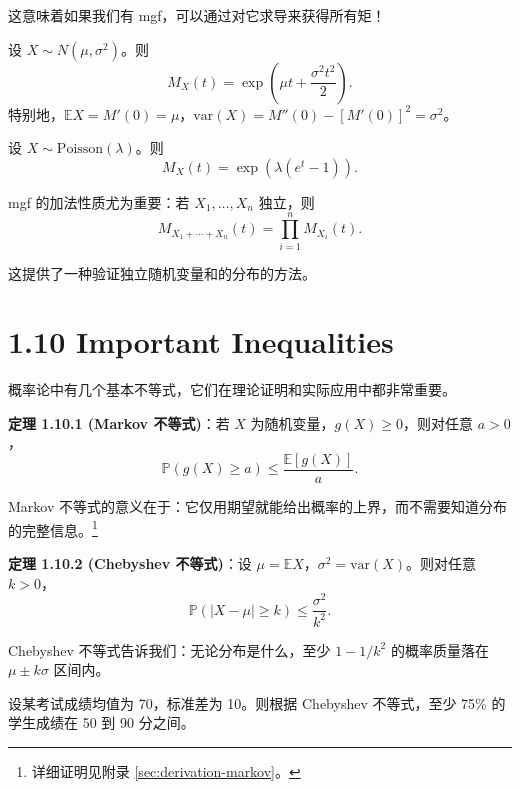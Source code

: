 这意味着如果我们有 mgf，可以通过对它求导来获得所有矩！

\begin{example}\label{ex:normal-mgf-ch1}
设 $X \sim N(\mu, \sigma^2)$。则
\[
M_X(t) = \exp\left(\mu t + \frac{\sigma^2 t^2}{2}\right).
\]
特别地，$\mathbb{E}X = M'(0) = \mu$，$\text{var}(X) = M''(0) - [M'(0)]^2 = \sigma^2$。
\end{example}

\begin{example}\label{ex:poisson-mgf-ch1}
设 $X \sim \text{Poisson}(\lambda)$。则
\[
M_X(t) = \exp(\lambda(e^t - 1)).
\]
\end{example}

mgf 的加法性质尤为重要：若 $X_1, \ldots, X_n$ 独立，则
\[
M_{X_1+\cdots+X_n}(t) = \prod_{i=1}^n M_{X_i}(t).
\tag{1.9.5}\label{eq:mgf-sum-ch1}
\]

这提供了一种验证独立随机变量和的分布的方法。

\section{1.10 Important Inequalities}\label{sec:1.10}

概率论中有几个基本不等式，它们在理论证明和实际应用中都非常重要。

\begin{remark}
\textbf{定理 1.10.1 (Markov 不等式)}：若 $X$ 为随机变量，$g(X) \geq 0$，则对任意 $a > 0$，
\[
\mathbb{P}(g(X) \geq a) \leq \frac{\mathbb{E}[g(X)]}{a}.
\tag{1.10.1}\label{eq:markov-ch1}
\]

Markov 不等式的意义在于：它仅用期望就能给出概率的上界，而不需要知道分布的完整信息。\footnote{详细证明见附录 \cref{sec:derivation-markov}。}
\end{remark}

\begin{remark}
\textbf{定理 1.10.2 (Chebyshev 不等式)}：设 $\mu = \mathbb{E}X$，$\sigma^2 = \text{var}(X)$。则对任意 $k > 0$，
\[
\mathbb{P}(|X - \mu| \geq k) \leq \frac{\sigma^2}{k^2}.
\tag{1.10.2}\label{eq:chebyshev-ch1}
\]

Chebyshev 不等式告诉我们：无论分布是什么，至少 $1 - 1/k^2$ 的概率质量落在 $\mu \pm k\sigma$ 区间内。
\end{remark}

\begin{example}[Chebyshev应用]\label{ex:chebyshev-app-ch1}
设某考试成绩均值为 70，标准差为 10。则根据 Chebyshev 不等式，至少 75\% 的学生成绩在 50 到 90 分之间。
\end{example}

